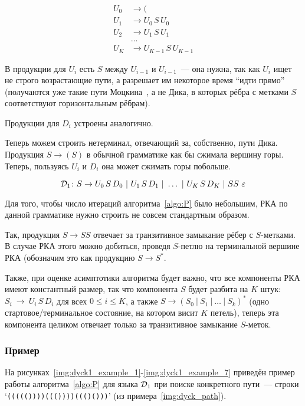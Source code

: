 \begin{align*}\label{eq:U}
  U_0 &\to ( \\
  U_1 &\to U_0\, S\, U_0 \\
  U_2 &\to U_1\, S\, U_1 \\
  &\dots \\
  U_K &\to U_{K-1}\, S\, U_{K-1} 
\end{align*}

В продукции для $U_i$ есть $S$ между $U_{i-1}$ и $U_{i-1}$~--- она нужна, так как $U_i$ ищет не строго возрастающие пути, а разрешает им некоторое время ``идти прямо'' (получаются уже такие пути Моцкина~\cite{Donaghey1977}, а не Дика, в которых рёбра с метками $S$ соответствуют горизонтальным рёбрам).

Продукции для $D_i$ устроены аналогично.

Теперь можем строить нетерминал, отвечающий за, собственно, пути Дика. Продукция $S \to ( S )$ в обычной грамматике как бы сжимала вершину горы. Теперь, пользуясь $U_i$ и $D_i$ она может сжимать горы побольше.

\vspace{-10pt}

\begin{equation}\label{eq:S}
  \mathcal{D}_1 \colon S \rightarrow U_0\, S\, D_0~|~U_1\, S\, D_1~|~ \dots ~|~U_K\, S\, D_K~|~SS~\varepsilon
\end{equation}

Для того, чтобы число итераций алгоритма~\ref{algo:P} было небольшим, РКА по данной грамматике нужно строить не совсем стандартным образом.

Так, продукция $S \to SS$ отвечает за транзитивное замыкание рёбер с $S$-метками. В случае РКА этого можно добиться, проведя $S$-петлю на терминальной вершине РКА (обозначим это как продукцию $S \to S^*$.

Также, при оценке асимптотики алгоритма будет важно, что все компоненты РКА имеют константный размер, так что компонента $S$ будет разбита на $K$ штук: $S_i~\to~U_i\,S \,D_i$ для всех $0 \le i \le K$, а также $S \to (S_0~|~S_1~|~ \dots ~|~ S_k)^*$ (одно стартовое/терминальное состояние, на котором висит $K$ петель), теперь эта компонента целиком отвечает только за транзитивное замыкание $S$-меток.

\subsubsection{Пример}

На рисунках~\ref{img:dyck1_example_1}-\ref{img:dyck1_example_7} приведён пример работы алгоритма~\ref{algo:P} для языка $\mathcal{D}_1$ при поиске конкретного пути~--- строки `\texttt{((((())))((())))((()()))}' (из примера~\ref{img:dyck_path}).

